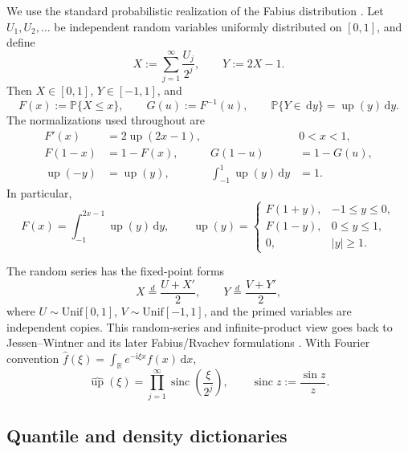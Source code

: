\documentclass[11pt,oneside]{article}
\theoremstyle{definition}
\theoremstyle{remark}
\newcommand{\R}{\mathbb R}
\newcommand{\Prob}{\mathbb P}
\newcommand{\Up}{\operatorname{up}}
\newcommand{\sinc}{\operatorname{sinc}}
\newcommand{\dd}{\,\mathrm d}
\newcommand{\ii}{\mathrm i}
\begin{document}
We use the standard probabilistic realization of the Fabius distribution
\cite{Fabius1966,arias1982}.  Let $U_1,U_2,\ldots$ be independent random
variables uniformly distributed on $[0,1]$, and define
\begin{equation}
 X:=\sum_{j=1}^{\infty}\frac{U_j}{2^j},
 \qquad
 Y:=2X-1.
 \label{eq:X-Y-def}
\end{equation}
Then $X\in[0,1]$, $Y\in[-1,1]$, and
\begin{equation}
 F(x):=\Prob\{X\le x\},
 \qquad
 G(u):=F^{-1}(u),
 \qquad
 \Prob\{Y\in\dd y\}=\Up(y)\dd y.
\end{equation}
The normalizations used throughout are
\begin{align}
 F'(x)&=2\Up(2x-1), &&0<x<1, \label{eq:density-relation}\\
 F(1-x)&=1-F(x), &
 G(1-u)&=1-G(u), \label{eq:symmetry-FG}\\
 \Up(-y)&=\Up(y), &
 \int_{-1}^{1}\Up(y)\dd y&=1. \label{eq:up-symmetry}
\end{align}
In particular,
\begin{equation}
 F(x)=\int_{-1}^{2x-1}\Up(y)\dd y,
 \qquad
 \Up(y)=
 \begin{cases}
 F(1+y),&-1\le y\le0,\\
 F(1-y),&0\le y\le1,\\
 0,&|y|\ge1.
 \end{cases}
 \label{eq:F-up-dictionary}
\end{equation}

The random series has the fixed-point forms
\begin{equation}
 X\overset d=\frac{U+X'}2,
 \qquad
 Y\overset d=\frac{V+Y'}2,
 \label{eq:fixed-points}
\end{equation}
where $U\sim\mathrm{Unif}[0,1]$, $V\sim\mathrm{Unif}[-1,1]$, and the primed
variables are independent copies.  This random-series and infinite-product
view goes back to Jessen--Wintner and its later Fabius/Rvachev formulations
\cite{JessenWintner,Fabius1966,arias1982}.  With Fourier convention
$\widehat f(\xi)=\int_{\R}e^{-\ii\xi x}f(x)\dd x$,
\begin{equation}
 \widehat{\Up}(\xi)
 =\prod_{j=1}^{\infty}\sinc\!\left(\frac{\xi}{2^j}\right),
 \qquad \sinc z:=\frac{\sin z}{z}.
 \label{eq:up-fourier-product}
\end{equation}

\subsection{Quantile and density dictionaries}
\end{document}
